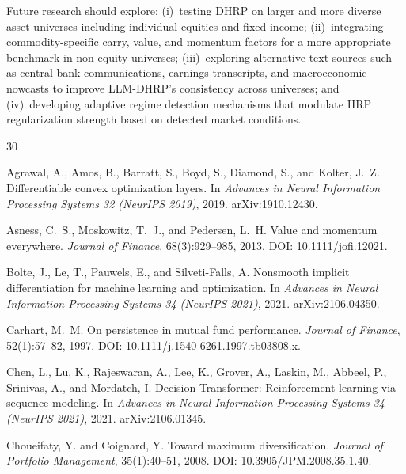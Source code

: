 \documentclass{article}
\begin{document}
Future research should explore: (i)~testing DHRP on larger and more diverse asset universes including individual equities and fixed income; (ii)~integrating commodity-specific carry, value, and momentum factors for a more appropriate benchmark in non-equity universes; (iii)~exploring alternative text sources such as central bank communications, earnings transcripts, and macroeconomic nowcasts to improve LLM-DHRP's consistency across universes; and (iv)~developing adaptive regime detection mechanisms that modulate HRP regularization strength based on detected market conditions.

\clearpage

\begin{thebibliography}{30}

Agrawal, A., Amos, B., Barratt, S., Boyd, S., Diamond, S., and Kolter, J.~Z.
\newblock Differentiable convex optimization layers.
\newblock In \emph{Advances in Neural Information Processing Systems 32 (NeurIPS 2019)}, 2019. arXiv:1910.12430.

Asness, C.~S., Moskowitz, T.~J., and Pedersen, L.~H.
\newblock Value and momentum everywhere.
\newblock \emph{Journal of Finance}, 68(3):929--985, 2013.
\newblock DOI: 10.1111/jofi.12021.

Bolte, J., Le, T., Pauwels, E., and Silveti-Falls, A.
\newblock Nonsmooth implicit differentiation for machine learning and optimization.
\newblock In \emph{Advances in Neural Information Processing Systems 34 (NeurIPS 2021)}, 2021. arXiv:2106.04350.

Carhart, M.~M.
\newblock On persistence in mutual fund performance.
\newblock \emph{Journal of Finance}, 52(1):57--82, 1997.
\newblock DOI: 10.1111/j.1540-6261.1997.tb03808.x.

Chen, L., Lu, K., Rajeswaran, A., Lee, K., Grover, A., Laskin, M., Abbeel, P., Srinivas, A., and Mordatch, I.
\newblock Decision Transformer: Reinforcement learning via sequence modeling.
\newblock In \emph{Advances in Neural Information Processing Systems 34 (NeurIPS 2021)}, 2021. arXiv:2106.01345.

Choueifaty, Y. and Coignard, Y.
\newblock Toward maximum diversification.
\newblock \emph{Journal of Portfolio Management}, 35(1):40--51, 2008.
\newblock DOI: 10.3905/JPM.2008.35.1.40.


\end{thebibliography}
\end{document}
